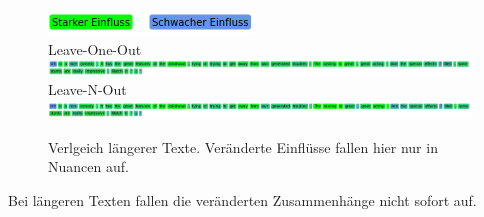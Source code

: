 \documentclass[DIV=13,fontsize=11pt]{scrartcl}
\begin{document}
\begin{figure}[H]
    \centering
    \includegraphics[]{img/legend.png}\\
    Leave-One-Out\\
    \includegraphics[width=\linewidth]{img/new_ex1_loo.png}\\
    Leave-N-Out\\
    \includegraphics[width=\linewidth]{img/new_ex1_lno.png}
    \caption{Verlgeich längerer Texte. Veränderte Einflüsse fallen hier nur in Nuancen auf.}
    \label{fig:ex5}
\end{figure}

Bei längeren Texten fallen die veränderten Zusammenhänge nicht sofort auf.
\end{document}
